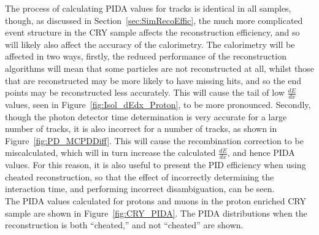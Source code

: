 The process of calculating PIDA values for tracks is identical in all samples, though, as discussed in Section~\ref{sec:SimRecoEffic}, the much more complicated event structure in the CRY sample affects the reconstruction efficiency, and so will likely also affect the accuracy of the calorimetry. The calorimetry will be affected in two ways, firstly, the reduced performance of the reconstruction algorithms will mean that some particles are not reconstructed at all, whilst those that are reconstructed may be more likely to have missing hits, and so the end points may be reconstructed less accurately. This will cause the tail of low $\frac{dE}{dx}$ values, seen in Figure~\ref{fig:Isol_dEdx_Proton}, to be more pronounced. Secondly, though the photon detector time determination is very accurate for a large number of tracks, it is also incorrect for a number of tracks, as shown in Figure~\ref{fig:PD_MCPDDiff}. This will cause the recombination correction to be miscalculated, which will in turn increase the calculated $\frac{dE}{dx}$, and hence PIDA values. For this reason, it is also useful to present the PID efficiency when using cheated reconstruction, so that the effect of incorrectly determining the interaction time, and performing incorrect disambiguation, can be seen. \\

The PIDA values calculated for protons and muons in the proton enriched CRY sample are shown in Figure~\ref{fig:CRY_PIDA}. The PIDA distributions when the reconstruction is both ``cheated,'' and not ``cheated'' are shown. \\

